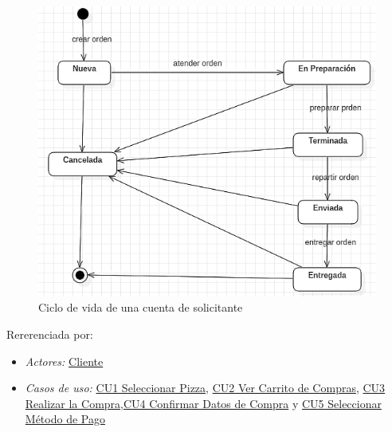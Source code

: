 \begin{figure}[h]
	
	\begin{center}				
		
		\includegraphics[scale=0.50]{imagenes/CiclosDeVida/cv-Orden.png}
		\caption{Ciclo de vida de una cuenta de solicitante}
		\label{fig:CV:Orden}
		
	\end{center}
	
\end{figure}
		\noindent Rererenciada por: 
		
			\begin{itemize}

				\item \textit{Actores:} \hyperlink{A:Cliente}{Cliente}

				\item \textit{Casos de uso:} \hyperlink{CU1}{CU1 Seleccionar Pizza}, \hyperlink{CU2}{CU2 Ver Carrito de Compras}, \hyperlink{CU3}{CU3 Realizar la Compra},\hyperlink{CU4}{CU4 Confirmar Datos de Compra} y \hyperlink{CU5}{CU5 Seleccionar Método de Pago}

			\end{itemize}

